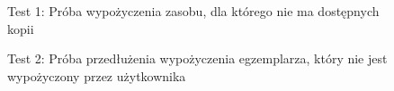 \begin{figure}[H]
    \centering
    \caption{Test 1: Próba wypożyczenia zasobu, dla którego nie ma dostępnych kopii}
\end{figure}

\begin{figure}[H]
    \centering
    \caption{Test 2: Próba przedłużenia wypożyczenia egzemplarza, który nie jest wypożyczony przez użytkownika}
\end{figure}


